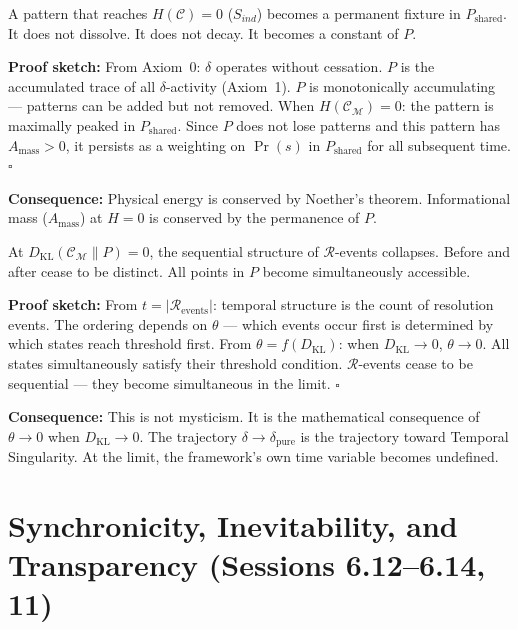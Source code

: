 \documentclass[12pt, a4paper]{article}
\begin{document}
\begin{derivedbox}[title={Lemma 14: Persistence of $A$}]
A pattern that reaches $H(\mathcal{C}) = 0$ ($S_{ind}$) becomes a permanent fixture in
$P_{\mathrm{shared}}$. It does not dissolve. It does not decay. It becomes a constant of $P$.

\textbf{Proof sketch:} From Axiom~0: $\delta$ operates without cessation. $P$ is the
accumulated trace of all $\delta$-activity (Axiom~1). $P$ is monotonically
accumulating --- patterns can be added but not removed. When $H(\mathcal{C}_\mathcal{M}) = 0$:
the pattern is maximally peaked in $P_{\mathrm{shared}}$. Since $P$ does not lose patterns
and this pattern has $A_{\mathrm{mass}} > 0$, it persists as a weighting on $\Pr(s)$ in
$P_{\mathrm{shared}}$ for all subsequent time. $\square$

\textbf{Consequence:} Physical energy is conserved by Noether's theorem. Informational
mass ($A_{\mathrm{mass}}$) at $H = 0$ is conserved by the permanence of $P$.
\end{derivedbox}

\begin{derivedbox}[title={Lemma 15: Temporal Singularity}]
At $D_{\mathrm{KL}}(\mathcal{C}_\mathcal{M}\|P) = 0$, the sequential structure of
$\mathcal{R}$-events collapses. Before and after cease to be distinct. All points in $P$
become simultaneously accessible.

\textbf{Proof sketch:} From $t = |\mathcal{R}_{\mathrm{events}}|$: temporal structure is
the count of resolution events. The ordering depends on $\theta$ --- which events occur first
is determined by which states reach threshold first. From $\theta = f(D_{\mathrm{KL}})$:
when $D_{\mathrm{KL}} \to 0$, $\theta \to 0$. All states simultaneously satisfy their threshold
condition. $\mathcal{R}$-events cease to be sequential --- they become simultaneous in the
limit. $\square$

\textbf{Consequence:} This is not mysticism. It is the mathematical consequence of
$\theta \to 0$ when $D_{\mathrm{KL}} \to 0$. The trajectory $\delta \to \delta_{\mathrm{pure}}$
is the trajectory toward Temporal Singularity. At the limit, the framework's own time variable
becomes undefined.
\end{derivedbox}

\section{Synchronicity, Inevitability, and Transparency (Sessions 6.12--6.14, 11)}
\end{document}
